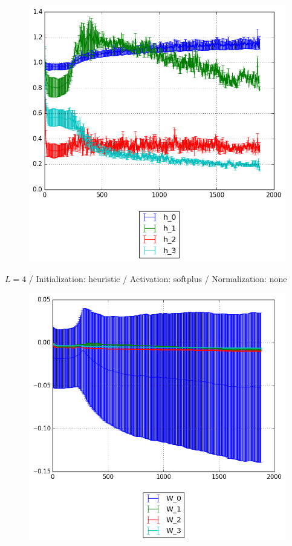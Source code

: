 \documentclass{beamer}
\begin{document}
{\begin{frame}[t]{}{}
\begin{figure}
    			\includegraphics[scale=0.4]{gfx/l4b32_softplus_heuristic_identity_cnn_activations}
    		\end{figure}
    		\vfill
	\end{frame}
	\begin{frame}[t]{}{}%
		\vfill
		\begin{center}
			{$L = 4$ / Initialization: heuristic / Activation: softplus / Normalization: none}
		\end{center}
    		\begin{figure}
    			\centering
    			\includegraphics[scale=0.4]{gfx/l4b32_softplus_heuristic_identity_cnn_weights}
    		\end{figure}
    		\vfill
	\end{frame}
	
}
\end{document}
